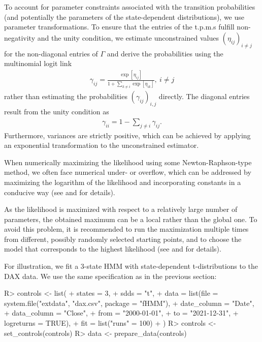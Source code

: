 \documentclass[article]{jss}
\begin{document}
To account for parameter constraints associated with the transition probabilities (and potentially the parameters of the state-dependent distributions), we use parameter transformations. To ensure that the entries of the t.p.m.s fulfill non-negativity and the unity condition, we estimate unconstrained values $(\eta_{ij})_{i\neq j}$ for the non-diagonal entries of $\Gamma$ and derive the probabilities using the multinomial logit link
\begin{align*}
\gamma_{ij}=\frac{\exp[\eta_{ij}]}{1+\sum_{k\neq i}\exp[\eta_{ik}]},~i\neq j
\end{align*}
rather than estimating the probabilities $(\gamma_{ij})_{i,j}$ directly. The diagonal entries result from the unity condition as
\begin{align*}
\gamma_{ii}=1-\sum_{j\neq i}\gamma_{ij}.
\end{align*}
Furthermore, variances are strictly positive, which can be achieved by applying an exponential transformation to the unconstrained estimator.

When numerically maximizing the likelihood using some Newton-Raphson-type method, we often face numerical under- or overflow, which can be addressed by maximizing the logarithm of the likelihood and incorporating constants in a conducive way (see \cite{zuc16} and \cite{oel21} for details).

As the likelihood is maximized with respect to a relatively large number of parameters, the obtained maximum can be a local rather than the global one. To avoid this problem, it is recommended to run the maximization multiple times from different, possibly randomly selected starting points, and to choose the model that corresponds to the highest likelihood (see \cite{zuc16} and \cite{oel21} for details). %

For illustration, we fit a 3-state HMM with state-dependent t-distributions to the DAX data. We use the same specification as in the previous section:

%
\begin{Schunk}
\begin{Sinput}
R> controls <- list(
+    states = 3,
+    sdds   = "t",
+    data   = list(file        = system.file("extdata", "dax.csv", package = "fHMM"),
+                  date_column = "Date",
+                  data_column = "Close",
+                  from        = "2000-01-01",
+                  to          = "2021-12-31",
+                  logreturns  = TRUE),
+    fit    = list("runs" = 100)
+  )
R> controls <- set_controls(controls)
R> data <- prepare_data(controls)
\end{Sinput}
\end{Schunk}
%
\end{document}
